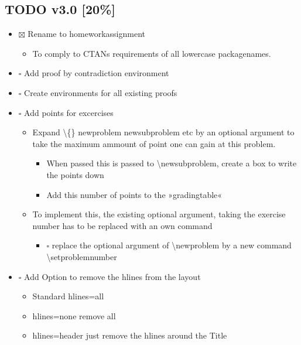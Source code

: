 \documentclass[11pt]{article}
\begin{document}
\subsection{{\bfseries\sffamily TODO} v3.0 [20\%]}
\label{sec-2-1}
\begin{itemize}
\item $\boxtimes$ Rename to homeworkassignment
\begin{itemize}
\item To comply to CTANs requirements of all lowercase packagenames.
\end{itemize}
\item $\square$ Add proof by contradiction environment
\item $\square$ Create environments for all existing proofs
\item $\square$ Add points for excercises
\begin{itemize}
\item Expand \textbackslash \{\} newproblem newsubproblem etc by an
optional argument to take the maximum ammount of point one can
gain at this problem.
\begin{itemize}
\item When passed this is passed to \textbackslash{}newsubproblem,
create a box to write the points down
\item Add this number of points to the »gradingtable«
\end{itemize}
\item To implement this, the existing optional argument, taking
the exercise number has to be replaced with an own command
\begin{itemize}
\item $\square$ replace the optional argument of
\textbackslash{}newproblem by a new command
\textbackslash{}setproblemnumber
\end{itemize}
\end{itemize}
\item $\square$ Add Option to remove the hlines from the layout
\begin{itemize}
\item Standard hlines=all
\item hlines=none remove all
\item hlines=header just remove the hlines around the Title
\end{itemize}
\end{itemize}
\end{document}
